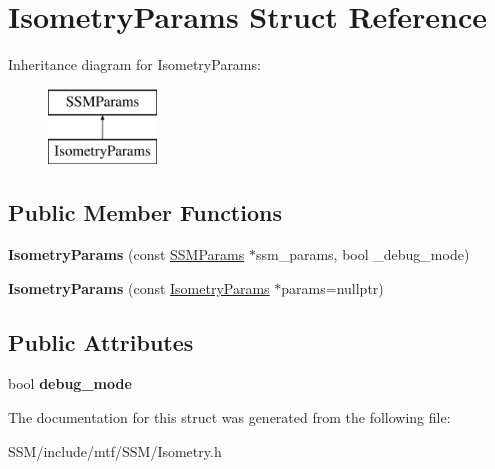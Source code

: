 \hypertarget{structIsometryParams}{\section{Isometry\-Params Struct Reference}
\label{structIsometryParams}
}
Inheritance diagram for Isometry\-Params\-:\begin{figure}[H]
\begin{center}
\leavevmode
\includegraphics[height=2.000000cm]{structIsometryParams}
\end{center}
\end{figure}
\subsection*{Public Member Functions}
\begin{DoxyCompactItemize}
\item 
\hypertarget{structIsometryParams_a02a9920b1c4a4fd06903079d3a02d22b}{{\bfseries Isometry\-Params} (const \hyperlink{structSSMParams}{S\-S\-M\-Params} $\ast$ssm\-\_\-params, bool \-\_\-debug\-\_\-mode)}\label{structIsometryParams_a02a9920b1c4a4fd06903079d3a02d22b}

\item 
\hypertarget{structIsometryParams_a8d3eeab90d7ddf3f0174d8b87ea3ed19}{{\bfseries Isometry\-Params} (const \hyperlink{structIsometryParams}{Isometry\-Params} $\ast$params=nullptr)}\label{structIsometryParams_a8d3eeab90d7ddf3f0174d8b87ea3ed19}

\end{DoxyCompactItemize}
\subsection*{Public Attributes}
\begin{DoxyCompactItemize}
\item 
\hypertarget{structIsometryParams_a0d823a2f8964be2a9fc23bafdfb2944c}{bool {\bfseries debug\-\_\-mode}}\label{structIsometryParams_a0d823a2f8964be2a9fc23bafdfb2944c}

\end{DoxyCompactItemize}


The documentation for this struct was generated from the following file\-:\begin{DoxyCompactItemize}
\item 
S\-S\-M/include/mtf/\-S\-S\-M/Isometry.\-h\end{DoxyCompactItemize}
